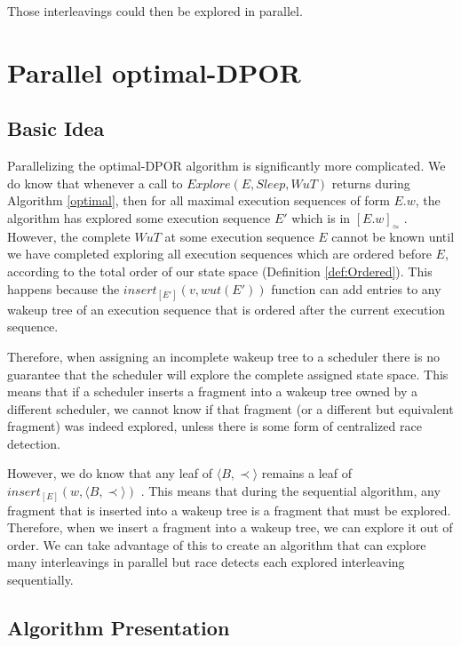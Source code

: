  Those 
interleavings could then be explored in parallel.


\section{Parallel optimal-DPOR}

\subsection{Basic Idea}

Parallelizing the optimal-DPOR algorithm is significantly more complicated. We do know that whenever a call to 
$Explore(E, Sleep, WuT)$ returns during Algorithm \ref{optimal}, then for all maximal execution sequences
of form $E.w$, the algorithm has explored some execution sequence $E'$ which is in $[E.w]_\simeq$ \cite{AbdullaAronisJohnssonSagonasDPOR2014}.
However, the complete $WuT$ at some execution sequence $E$ cannot be known until we have completed
exploring all execution sequences which are ordered before $E$, according to the total order of our state space
(Definition \ref{def:Ordered}). This happens because the $insert_{[E']}(v,wut(E'))$ function can add
entries to any wakeup tree of an execution sequence that is ordered after the current execution sequence.

Therefore, when assigning an incomplete wakeup tree to a scheduler there is no
guarantee that the scheduler will explore the complete assigned state space. This means that if a
scheduler inserts a fragment into a wakeup tree owned by a different scheduler, we cannot know if that 
fragment (or a different but equivalent fragment) was indeed explored, unless there is some form of
centralized race detection.

However, we do know that any leaf of $\langle B , \prec \rangle$ remains a leaf of $insert_{[E]}(w,\langle B , \prec \rangle)$
\cite{AbdullaAronisJohnssonSagonasDPOR2014}. This means that during the sequential algorithm, any fragment that
is inserted into a wakeup tree is a fragment that must be explored. Therefore, when we insert a fragment into a wakeup tree,
we can explore it out of order. We can take advantage of this to create an algorithm that can explore many interleavings in parallel
but race detects each explored interleaving sequentially.

\subsection{Algorithm Presentation}

